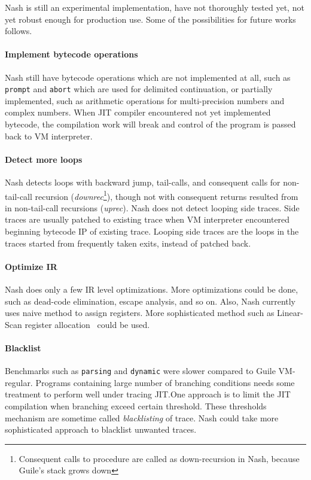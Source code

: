 \documentclass[preprint]{sigplanconf}
\begin{document}
Nash is still an experimental implementation, have not thoroughly tested yet,
not yet robust enough for production use. Some of the possibilities for future
works follows.

\paragraph{Implement bytecode operations} Nash still have bytecode
operations which are not implemented at all, such as \texttt{prompt} and
\texttt{abort} which are used for delimited continuation, or partially
implemented, such as arithmetic operations for multi-precision numbers and
complex numbers. When JIT compiler encountered not yet implemented bytecode,
the compilation work will break and control of the program is passed back to
VM interpreter.

\paragraph{Detect more loops} Nash detects loops with backward jump,
tail-calls, and consequent calls for non-tail-call recursion
(\textit{downrec}\footnote{Consequent calls to procedure are called as
  down-recursion in Nash, because Guile's stack grows down}), though not with
consequent returns resulted from in non-tail-call recursions
(\textit{uprec}). Nash does not detect looping side traces. Side traces are
usually patched to existing trace when VM interpreter encountered beginning
bytecode IP of existing trace. Looping side traces are the loops in the traces
started from frequently taken exits, instead of patched back.

\paragraph{Optimize IR} Nash does only a few IR level optimizations.
More optimizations could be done, such as dead-code elimination, escape
analysis, and so on. Also, Nash currently uses naive method to assign
registers. More sophisticated method such as Linear-Scan register
allocation~\cite{poletto1999linear} could be used.

\paragraph{Blacklist} Benchmarks such as \texttt{parsing} and
\texttt{dynamic} were slower compared to Guile VM-regular. Programs containing
large number of branching conditions needs some treatment to perform well
under tracing JIT.\@ One approach is to limit the JIT compilation when
branching exceed certain threshold. These thresholds mechanism are sometime
called \textit{blacklisting} of trace. Nash could take more sophisticated
approach to blacklist unwanted traces.
\end{document}
